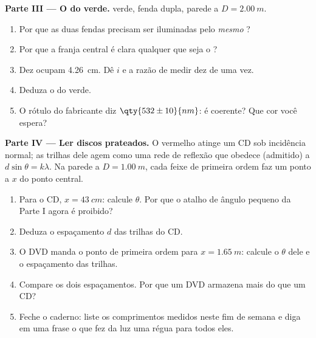 \begin{problem}
\medskip
\noindent\textbf{Parte III --- O  do  verde.}
 verde, fenda dupla, parede a $D = \qty{2.00}{m}$.
\begin{enumerate}[resume]
  \item Por que as duas fendas precisam ser iluminadas pelo \emph{mesmo}
        ?
  \item Por que a franja central é clara qualquer que seja o ?
  \item Dez  ocupam \qty{4.26}{cm}. Dê $i$ e a razão de medir
        dez de uma vez.
  \item Deduza o  do  verde.
  \item O rótulo do fabricante diz $\qty{532 \pm 10}{nm}$: é coerente?
        Que cor você espera?
\end{enumerate}

\medskip
\noindent\textbf{Parte IV --- Ler discos prateados.} O  vermelho
atinge um CD sob incidência normal; as trilhas dele agem como uma rede de
reflexão que obedece (admitido) a $d \sin\theta = k\lambda$. Na parede a
$D = \qty{1.00}{m}$, cada feixe de primeira ordem faz um ponto a $x$ do
ponto central.
\begin{enumerate}[resume]
  \item Para o CD, $x = \qty{43}{cm}$: calcule $\theta$. Por que o atalho
        de ângulo pequeno da Parte I agora é proibido?
  \item Deduza o espaçamento $d$ das trilhas do CD.
  \item O DVD manda o ponto de primeira ordem para $x = \qty{1.65}{m}$:
        calcule o $\theta$ dele e o espaçamento das trilhas.
  \item Compare os dois espaçamentos. Por que um DVD armazena mais do que
        um CD?
  \item Feche o caderno: liste os comprimentos medidos neste fim de
        semana e diga em uma frase o que fez da luz uma régua para todos
        eles.
\end{enumerate}
\end{problem}
